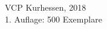 \begin{centering}
\begin{multicols}{2}
\end{multicols}

\vfill

\subsection*{}
VCP Kurhessen, 2018 \\
1. Auflage: 500 Exemplare

\end{centering}

